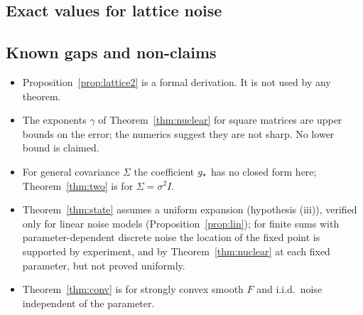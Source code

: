 \subsection{Exact values for lattice noise}
\begin{table}[h]\centering\small
{}
\caption{Scaled bias $b\,G_b^\st$ for i.i.d.\ entries in $\{-1,2\}$ with probabilities $\frac23,\frac13$ at the largest batch
size computed in each residue class, and the prediction $\gs$.}\label{tab:exact}
\end{table}

\subsection{Known gaps and non-claims}
\begin{itemize}\setlength\itemsep{2pt}
\item Proposition~\ref{prop:lattice2} is a formal derivation. It is not used by any theorem.
\item The exponents $\gamma$ of Theorem~\ref{thm:nuclear} for square matrices are upper bounds on the error; the numerics
suggest they are not sharp. No lower bound is claimed.
\item For general covariance $\Sigma$ the coefficient $\gs$ has no closed form here; Theorem~\ref{thm:two} is for
$\Sigma=\sigma^2I$.
\item Theorem~\ref{thm:state} assumes a uniform expansion (hypothesis (iii)), verified only for linear noise models
(Proposition~\ref{prop:lin}); for finite sums with parameter-dependent discrete noise the location of the fixed point
is supported by experiment, and by Theorem~\ref{thm:nuclear} at each fixed parameter, but not proved uniformly.
\item Theorem~\ref{thm:conv} is for strongly convex smooth $F$ and i.i.d.\ noise independent of the parameter.
\end{itemize}
